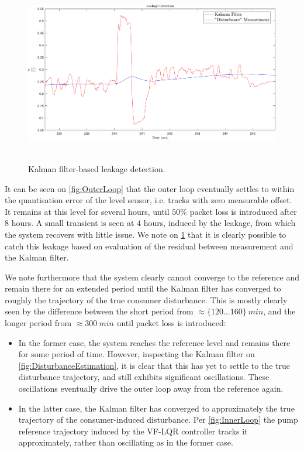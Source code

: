 \begin{figure}[h!]
	\includegraphics[height=8cm,width=\linewidth]{Pictures/LeakageDetection.pdf}
	\caption{Kalman filter-based leakage detection.}
	\label{fig:Leakage}
\end{figure}

It can be seen on \cref{fig:OuterLoop} that the outer loop eventually settles to within the quantisation error of the level sensor, i.e. tracks with zero measurable offset. It remains at this level for several hours, until $50\%$ packet loss is introduced after $8$ hours. A small transient is seen at $4$ hours, induced by the leakage, from which the system recovers with little issue. We note on \cref{fig:Leakage} that it is clearly possible to catch this leakage based on evaluation of the residual between measurement and the Kalman filter. 

We note furthermore that the system clearly cannot converge to the reference and remain there for an extended period until the Kalman filter has converged to roughly the trajectory of the true consumer disturbance. This is mostly clearly seen by the difference between the short period from $\approx \{120 \ldots 160 \} \ \si{min}$, and the longer period from $\approx 300 \ \si{min}$ until packet loss is introduced: 

\clearpage

\begin{itemize}
	\item In the former case, the system reaches the reference level and remains there for some period of time. However, inspecting the Kalman filter on \cref{fig:DisturbanceEstimation}, it is clear that this has yet to settle to the true disturbance trajectory, and still exhibits significant oscillations. These oscillations eventually drive the outer loop away from the reference again.
	\item In the latter case, the Kalman filter has converged to approximately the true trajectory of the consumer-induced disturbance. Per \cref{fig:InnerLoop} the pump reference trajectory induced by the VF-LQR controller tracks it approximately, rather than oscillating as in the former case.
\end{itemize}  

